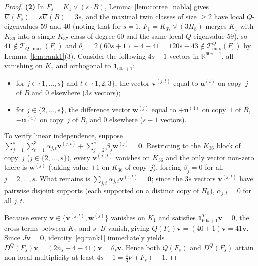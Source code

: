 \documentclass[11pt,a4paper]{article}
\theoremstyle{definition}
\begin{document}
\begin{proof}
  \textbf{(2)} In $F_s = K_1 \vee (s \cdot B)$, Lemma~\ref{lem:cotree_nabla} gives $\nabla(F_s) = s\nabla(B) = 3s$, and the maximal twin classes of size $\ge 2$ have local $Q$-eigenvalues $59$ and $40$ (noting that for $s = 1$, $F_1 = K_{37} \vee (3H_8)$ merges $K_1$ with $K_{36}$ into a single $K_{37}$ class of degree $60$ and the same local $Q$-eigenvalue $59$), so $41 \notin \mathcal{T}_{Q,\max}(F_s)$ and $\theta_s = 2(60s+1) - 4 - 41 = 120s - 43 \notin \mathcal{T}^Q_{\max}(F_s)$ by Lemma~\ref{lem:rank1}(3). Consider the following $4s - 1$ vectors in $\mathbb{R}^{60s+1}$, all vanishing on $K_1$ and orthogonal to $\mathbf{1}_{60s+1}$:
  \begin{itemize}
    \item for $j \in \{1,\dots,s\}$ and $t \in \{1,2,3\}$, the vector $\mathbf{v}^{(j,t)}$ equal to $\mathbf{u}^{(t)}$ on copy~$j$ of $B$ and $0$ elsewhere ($3s$ vectors);
    \item for $j \in \{2,\dots,s\}$, the difference vector $\mathbf{w}^{(j)}$ equal to $+\mathbf{u}^{(4)}$ on copy~$1$ of $B$, $-\mathbf{u}^{(4)}$ on copy~$j$ of $B$, and $0$ elsewhere ($s - 1$ vectors).
  \end{itemize}
  To verify linear independence, suppose $\sum_{j=1}^s \sum_{t=1}^3 \alpha_{j,t} \mathbf{v}^{(j,t)} + \sum_{j=2}^s \beta_j \mathbf{w}^{(j)} = \mathbf{0}$. Restricting to the $K_{36}$ block of copy~$j$ ($j \in \{2,\dots,s\}$), every $\mathbf{v}^{(j',t)}$ vanishes on $K_{36}$ and the only vector non-zero there is $\mathbf{w}^{(j)}$ (taking value $+1$ on $K_{36}$ of copy~$j$), forcing $\beta_j = 0$ for all $j = 2,\dots,s$. What remains is $\sum_{j,t} \alpha_{j,t} \mathbf{v}^{(j,t)} = \mathbf{0}$; since the $3s$ vectors $\mathbf{v}^{(j,t)}$ have pairwise disjoint supports (each supported on a distinct copy of $H_8$), $\alpha_{j,t} = 0$ for all $j, t$.

  Because every $\mathbf{v} \in \{\mathbf{v}^{(j,t)}, \mathbf{w}^{(j)}\}$ vanishes on $K_1$ and satisfies $\mathbf{1}_{60s+1}^T \mathbf{v} = 0$, the cross-terms between $K_1$ and $s \cdot B$ vanish, giving $Q(F_s)\mathbf{v} = (40 + 1)\mathbf{v} = 41\mathbf{v}$. Since $J\mathbf{v} = \mathbf{0}$, identity~\eqref{eq:rank1} immediately yields $D^Q(F_s)\mathbf{v} = (2n_s - 4 - 41)\mathbf{v} = \theta_s \mathbf{v}$. Hence both $Q(F_s)$ and $D^Q(F_s)$ attain non-local multiplicity at least $4s - 1 = \frac{4}{3}\nabla(F_s) - 1$.
\end{proof}
\end{document}

